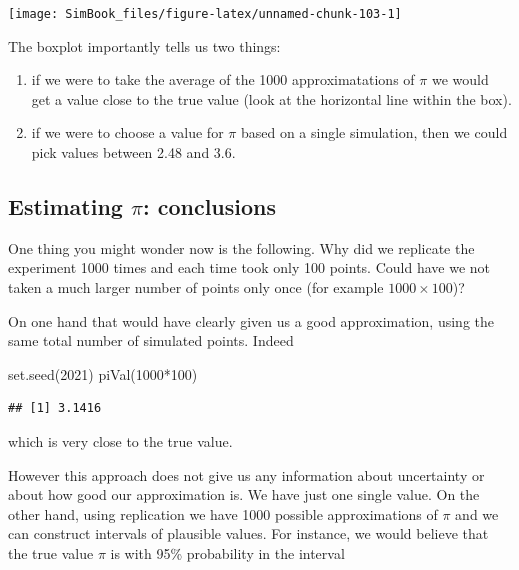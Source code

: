 \documentclass[
]{book}
\newenvironment{Shaded}{\begin{snugshade}}{\end{snugshade}}
\newcommand{\DecValTok}[1]{\textcolor[rgb]{0.00,0.00,0.81}{#1}}
\newcommand{\FunctionTok}[1]{\textcolor[rgb]{0.00,0.00,0.00}{#1}}
\newcommand{\NormalTok}[1]{#1}
\newcommand{\SpecialCharTok}[1]{\textcolor[rgb]{0.00,0.00,0.00}{#1}}
\begin{document}
\begin{center}\texttt{[image: SimBook\_files/figure-latex/unnamed-chunk-103-1]} \end{center}

The boxplot importantly tells us two things:

\begin{enumerate}
\def\labelenumi{\arabic{enumi}.}
\item
  if we were to take the average of the 1000 approximatations of \(\pi\) we would get a value close to the true value (look at the horizontal line within the box).
\item
  if we were to choose a value for \(\pi\) based on a single simulation, then we could pick values between 2.48 and 3.6.
\end{enumerate}

\hypertarget{estimating-pi-conclusions}{%
\subsection{\texorpdfstring{Estimating \(\pi\): conclusions}{Estimating \textbackslash pi: conclusions}}\label{estimating-pi-conclusions}}

One thing you might wonder now is the following. Why did we replicate the experiment 1000 times and each time took only 100 points. Could have we not taken a much larger number of points only once (for example \(1000\times 100\))?

On one hand that would have clearly given us a good approximation, using the same total number of simulated points. Indeed

\begin{Shaded}
\begin{Highlighting}[]
\FunctionTok{set.seed}\NormalTok{(}\DecValTok{2021}\NormalTok{)}
\FunctionTok{piVal}\NormalTok{(}\DecValTok{1000}\SpecialCharTok{*}\DecValTok{100}\NormalTok{)}
\end{Highlighting}
\end{Shaded}

\begin{verbatim}
## [1] 3.1416
\end{verbatim}

which is very close to the true value.

However this approach does not give us any information about uncertainty or about how good our approximation is. We have just one single value. On the other hand, using replication we have 1000 possible approximations of \(\pi\) and we can construct intervals of plausible values. For instance, we would believe that the true value \(\pi\) is with 95\% probability in the interval
\end{document}
